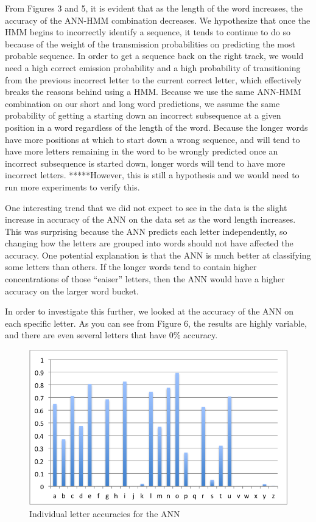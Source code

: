 \documentclass[11pt,a4paper,twocolumn]{article}
\begin{document}
From Figures 3 and 5, it is evident that as the length of the word increases, the accuracy of the ANN-HMM combination decreases. We hypothesize that once the HMM begins to incorrectly identify a sequence, it tends to continue to do so because of the weight of the transmission probabilities on predicting the most probable sequence. In order to get a sequence back on the right track, we would need a high correct emission probability and a high probability of transitioning from the previous incorrect letter to the current correct letter, which effectively breaks the reasons behind using a HMM. Because we use the same ANN-HMM combination on our short and long word predictions, we assume the same probability of getting a starting down an incorrect subsequence at a given position in a word regardless of the length of the word. Because the longer words have more positions at which to start down a wrong sequence, and will tend to have more letters remaining in the word to be wrongly predicted once an incorrect subsequence is started down, longer words will tend to have more incorrect letters. *****However, this is still a hypothesis and we would need to run more experiments to verify this.

One interesting trend that we did not expect to see in the data is the slight increase in accuracy of the ANN on the data set as the word length increases. This was surprising because the ANN predicts each letter independently, so changing how the letters are grouped into words should not have affected the accuracy. One potential explanation is that the ANN is much better at classifying some letters than others. If the longer words tend to contain higher concentrations of those ``eaiser'' letters, then the ANN would have a higher accuracy on the larger word bucket. 

In order to investigate this further, we looked at the accuracy of the ANN on each specific letter. As you can see from Figure 6, the results are highly variable, and there are even several letters that have 0\% accuracy.

\begin{figure}[h]
\centering
\caption{Individual letter accuracies for the ANN}
\includegraphics[scale=0.55]{img/letterPercentages.png}
\end{figure} 
\end{document}
